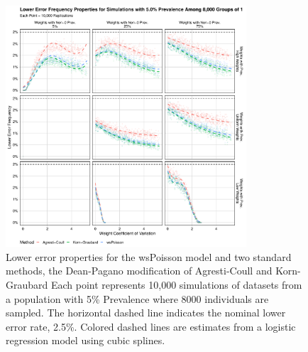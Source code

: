 \documentclass[AMA,STIX1COL]{WileyNJD-v2}
\begin{document}
\begin{figure}
\centering
\includegraphics[width=0.8\textwidth]{figures/perfect_lower_error_frequency_8000_groups_0_05_prev.pdf}
\caption{Lower error properties for the wsPoisson model and two standard methods, the Dean-Pagano modification of Agresti-Coull and Korn-Graubard
Each point represents 10,000 simulations of datasets from a population with 5\% Prevalence where 8000 individuals are sampled.
The horizontal dashed line indicates the nominal lower error rate, 2.5\%.
Colored dashed lines are estimates from a logistic regression model using cubic splines.}
\label{fig:perfect_lower_error_frequency_8000_groups_0_05_prev}
\end{figure}
\end{document}

